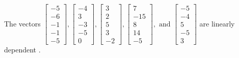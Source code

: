 \begin{exercise}
\begin{exerciseStatement}
  \end{exerciseStatement}
  \begin{exerciseAnswer}
   The vectors \(\left[\begin{array}{r}
-5 \\
-6 \\
-1 \\
-1 \\
-5
\end{array}\right] , \left[\begin{array}{r}
-4 \\
3 \\
-3 \\
-5 \\
0
\end{array}\right] , \left[\begin{array}{r}
3 \\
2 \\
5 \\
3 \\
-2
\end{array}\right] , \left[\begin{array}{r}
7 \\
-15 \\
8 \\
14 \\
-5
\end{array}\right] , \text{ and } \left[\begin{array}{r}
-5 \\
-4 \\
5 \\
-5 \\
3
\end{array}\right]\) are 
  	 linearly dependent  .
  


  \end{exerciseAnswer}
\end{exercise}